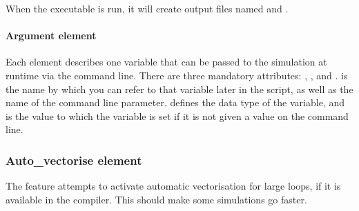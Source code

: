 \documentclass[letterpaper,10pt,english]{sphinxmanual}
\begin{document}
\sphinxAtStartPar
When the  executable is run, it will create output files named  and .

\ignorespaces 

\paragraph{Argument element}
\label{\detokenize{reference_elements:argument-element}}\label{\detokenize{reference_elements:argumentelement}}\label{\detokenize{reference_elements:index-7}}
\ignorespaces 
\sphinxAtStartPar
Each  element describes one variable that can be passed to the simulation at runtime via the command line. There are three mandatory attributes: , , and .  is the name by which you can refer to that variable later in the script, as well as the name of the command line parameter.  defines the data type of the variable, and  is the value to which the variable is set if it is not given a value on the command line.

\ignorespaces 

\subsubsection{Auto\_vectorise element}
\label{\detokenize{reference_elements:auto-vectorise-element}}\label{\detokenize{reference_elements:autovectorise}}\label{\detokenize{reference_elements:index-9}}
\sphinxAtStartPar
The  feature attempts to activate automatic vectorisation for large loops, if it is available in the compiler.  This should make some simulations go faster.
\end{document}
